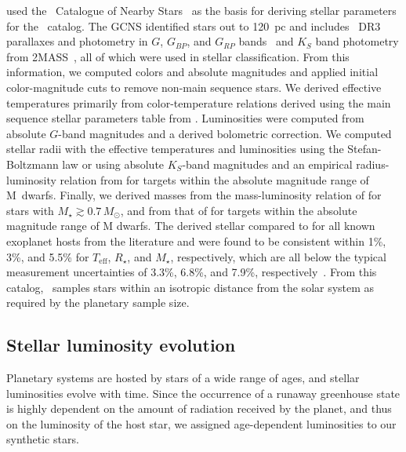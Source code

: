 \documentclass[twocolumn,twocolappendix,linenumbers]{aastex631}
\begin{document}
\citet{Hardegree-Ullman2023} used the \gaia\ Catalogue of Nearby Stars~\citep[hereafter GCNS,][]{Smart2021} as the basis for deriving stellar parameters for the \bioverse\ catalog.
The GCNS identified stars out to 120~pc and includes \gaia\ DR3 parallaxes and photometry in $G$, $G_{BP}$, and $G_{RP}$ bands~\citep{GaiaCollaboration2022} and $K_S$ band photometry from 2MASS~\citep{Cutri2003}, all of which were used in stellar classification.
From this information, we computed colors and absolute magnitudes and applied initial color-magnitude cuts to remove non-main sequence stars.
We derived effective temperatures primarily from color-temperature relations derived using the main sequence stellar parameters table from \citet{Pecaut2013}.
Luminosities were computed from absolute $G$-band magnitudes and a derived bolometric correction.
We computed stellar radii with the effective temperatures and luminosities using the Stefan-Boltzmann law or using absolute $K_S$-band magnitudes and an empirical radius-luminosity relation from \citet{Mann2015} for targets within the absolute magnitude range of M~dwarfs.
Finally, we derived masses from the mass-luminosity relation of \citet{Torres2010} for stars with $M_{\star}\gtrsim 0.7\,M_{\odot}$, and from that of \citet{Mann2019} for targets within the absolute magnitude range of M dwarfs.
The derived stellar  compared to  for all known exoplanet hosts from the literature and were found to be consistent within 1\%, 3\%, and 5.5\% for $T_{\mathrm{eff}}$, $R_{\star}$, and $M_{\star}$, respectively, which are all below the typical measurement uncertainties of 3.3\%, 6.8\%, and 7.9\%, respectively~.
From this catalog, \bioverse\ samples stars within an isotropic distance from the solar system as required by the planetary sample size.


\subsection{Stellar luminosity evolution}
Planetary systems are hosted by stars of a wide range of ages, and stellar luminosities evolve with time.
Since the occurrence of a runaway greenhouse state is highly dependent on the amount of radiation received by the planet, and thus on the luminosity of the host star, we assigned age-dependent luminosities to our synthetic stars.
\end{document}
